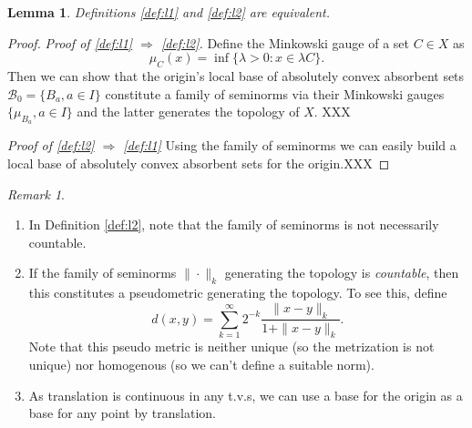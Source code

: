 \documentclass{scrartcl}
\newtheorem{lemma}{Lemma}
\theoremstyle{definition}
\theoremstyle{remark}
\newtheorem{remark}{Remark}
\begin{document}
\begin{lemma}
Definitions \ref{def:l1} and \ref{def:l2} are equivalent.
\end{lemma}
\begin{proof}
{\textit{Proof of \ref{def:l1} $\Rightarrow$ \ref{def:l2}.}}
Define the Minkowski gauge of a set $C\in X$ as 
\[\mu_C(x) = \inf\{\lambda> 0: x\in \lambda C\}.\]
Then we can show that the origin's local base of absolutely convex absorbent sets $\mathcal{B}_0 = \{B_a, a\in I\}$ constitute a family of seminorms via their Minkowski gauges $\{\mu_{B_a}, a\in I\}$ and the latter generates the topology of $X$. XXX

{\textit{Proof of \ref{def:l2} $\Rightarrow$ \ref{def:l1}}}
Using the family of seminorms we can easily build a local base of absolutely convex absorbent sets for the origin.XXX
\end{proof}

\begin{remark}\label{rem:locconv}

\begin{enumerate}
\item In Definition \ref{def:l2}, note that the family of seminorms is not necessarily countable.
\item If the family of seminorms $\|\cdot\|_k$ generating the topology is \textit{countable}, then this constitutes a pseudometric generating the topology. To see this, define
\begin{equation} d(x,y) = \sum_{k=1}^\infty 2^{-k} \frac{\|x-y\|_k}{1+\|x-y\|_k}.\label{eq:metric}
\end{equation}
Note that this pseudo	metric is neither unique (so the metrization is not unique) nor homogenous (so we can't define a suitable norm). 
\item As translation is continuous in any t.v.s, we can use a base for the origin as a base for any point by translation.
\end{enumerate}
\end{remark}
\end{document}
